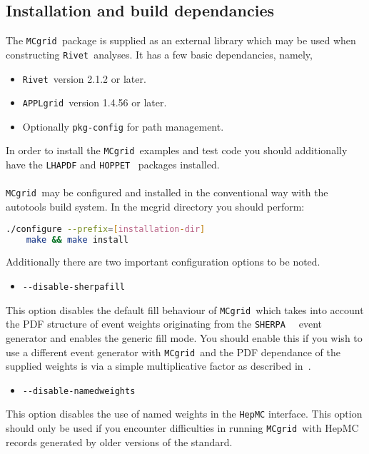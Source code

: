 \documentclass[11pt]{article}
\newcommand{\mcgrid} {{\tt MCgrid }}
\newcommand{\rivet} {{\tt Rivet }}
\newcommand{\appl} {{\tt APPLgrid }}
\newcommand{\sherpa} {{\tt SHERPA }}
\begin{document}
\subsection{Installation and build dependancies}
The \mcgrid package is supplied as an external library which may be used when constructing \rivet analyses. It has a few basic dependancies, namely,
\begin{itemize}
\item \rivet version 2.1.2 or later.
\item \appl version 1.4.56 or later.
\item Optionally {\tt pkg-config} for path management.
\end{itemize}
In order to install the \mcgrid examples and test code you should additionally have the {\tt LHAPDF} and {\tt HOPPET}~\cite{Salam:2008qg} packages installed. 
\\\\
\mcgrid may be configured and installed in the conventional way with the autotools build system. In the mcgrid directory you should perform:
\begin{lstlisting}[language=bash]
	./configure --prefix=[installation-dir]
	make && make install
\end{lstlisting}
Additionally there are two important configuration options to be noted.
\begin{itemize}
\item \lstinline[language=bash]{--disable-sherpafill }
\end{itemize}
This option disables the default fill behaviour of \mcgrid which takes into account the PDF structure of event weights originating from the \sherpa~\cite{Gleisberg:2008ta} event generator and enables the generic fill mode. You should enable this if you wish to use a different event generator with \mcgrid and the PDF dependance of the supplied weights is via a simple multiplicative factor as described in~\cite{cpc}.
\begin{itemize}
\item \lstinline[language=bash]{--disable-namedweights }
\end{itemize}
This option disables the use of named weights in the {\tt HepMC}\cite{Dobbs:2001ck} interface. This option should only be used if you encounter difficulties in running \mcgrid with HepMC records generated by older versions of the standard.
\vskip5pt
\end{document}
